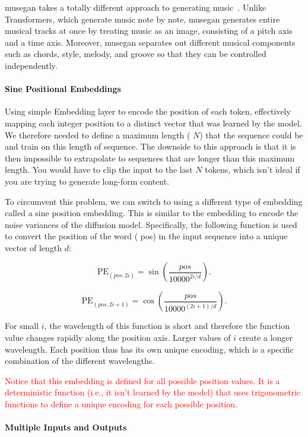 \gls{musegan} takes a totally different approach to generating music~\cite{dong2017musegan}.
Unlike Transformers, which generate music note by note, \gls{musegan} generates entire musical tracks at once by treating music as an image, consisting of a pitch axis and a time axis.
Moreover, \gls{musegan} separates out different musical components such as chords, style, melody, and groove so that they can be controlled independently.


\paragraph{Sine Positional Embeddings}

Using simple Embedding layer to encode the position of each token, effectively mapping each integer position to a distinct vector that was learned by the model.
We therefore needed to define a maximum length ( \( N \)) that the sequence could be and train on this length of sequence.
The downside to this approach is that it is then impossible to extrapolate to sequences that are longer than this maximum length.
You would have to clip the input to the last \( N \) tokens, which isn’t ideal if you are trying to generate long-form content.


To circumvent this problem, we can switch to using a different type of embedding called a sine position embedding.
This is similar to the embedding to encode the noise variances of the diffusion model.
Specifically, the following function is used to convert the position of the word ( pos) in the input sequence into a unique vector of length \( d \):

\[
	\mathrm{PE}_{\left(pos, 2i\right)} = \sin \left(\frac{pos}{10000^{2i/d}}\right)
	.\]

\[
	\mathrm{PE}_{\left(pos, 2i+1\right)} = \cos \left(\frac{pos}{10000^{\left(2i+1\right)/d}}\right)
	.\]

For small \( i \), the wavelength of this function is short and therefore the function value changes rapidly along the position axis.
Larger values of \( i \) create a longer wavelength.
Each position thus has its own unique encoding, which is a specific combination of the different wavelengths.

\textcolor{red}{Notice that this embedding is defined for all possible position values. It is a deterministic function (i.e., it isn’t learned by the model) that uses trigonometric functions to define a unique encoding for each possible position.}

\paragraph{Multiple Inputs and Outputs}

